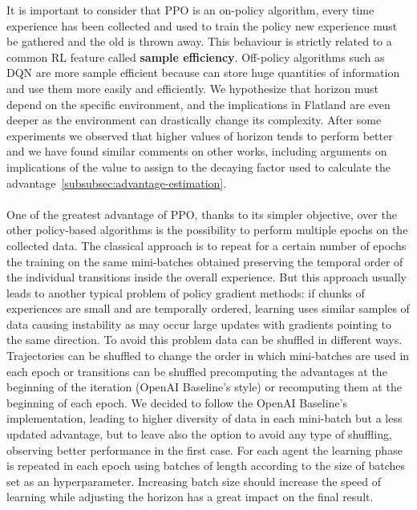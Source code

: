 \documentclass[11pt, a4paper, hidelinks]{report}
\begin{document}
It is important to consider that PPO is an on-policy algorithm, every time experience has been collected and used to train the policy new experience must be gathered and the old is thrown away.
This behaviour is strictly related to a common RL feature called \textbf{sample efficiency}.
Off-policy algorithms such as DQN are more sample efficient because can store huge quantities of information and use them more easily and efficiently.
We hypothesize that horizon must depend on the specific environment, and the implications in Flatland are even deeper as the environment can drastically change its complexity. %
After some experiments we observed that higher values of horizon tends to perform better and we have found similar comments on other works, including arguments on implications of the value to assign to the decaying factor used to calculate the advantage~\ref{subsubsec:advantage-estimation}.\\
\\
One of the greatest advantage of PPO, thanks to its simpler objective, over the other policy-based algorithms is the possibility to perform multiple epochs on the collected data.
The classical approach is to repeat for a certain number of epochs the training on the same mini-batches obtained preserving the temporal order of the individual transitions inside the overall experience.
But this approach usually leads to another typical problem of policy gradient methods: if chunks of experiences are small and are temporally ordered, learning uses similar samples of data causing instability as may occur large updates with gradients pointing to the same direction.
To avoid this problem data can be shuffled in different ways.
Trajectories can be shuffled to change the order in which mini-batches are used in each epoch or transitions can be shuffled precomputing the advantages at the beginning of the iteration (OpenAI Baseline's style) or recomputing them at the beginning of each epoch.
We decided to follow the OpenAI Baseline's implementation, leading to higher diversity of data in each mini-batch but a less updated advantage, but to leave also the option to avoid any type of shuffling, observing better performance in the first case.
For each agent the learning phase is repeated in each epoch using batches of length according to the size of batches set as an hyperparameter.
Increasing batch size should increase the speed of learning while adjusting the horizon has a great impact on the final result.
\end{document}
